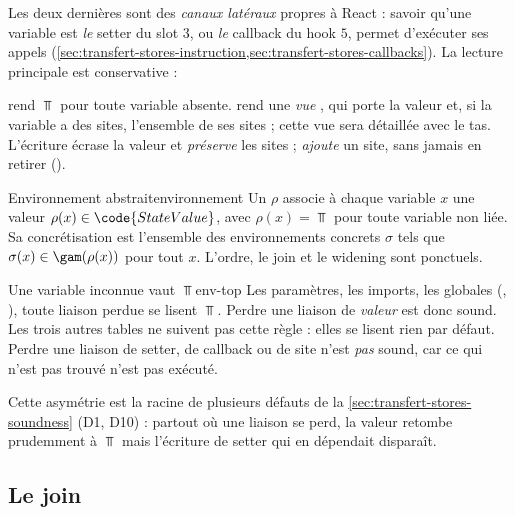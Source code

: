 Les deux dernières sont des \emph{canaux latéraux} propres à React : savoir
qu'une variable est \emph{le} setter du slot $3$, ou \emph{le} callback du
hook $5$, permet d'exécuter ses appels (\cref{sec:transfert-stores-instruction,sec:transfert-stores-callbacks}).
La lecture principale est conservative :


 rend $\Top$ pour toute variable absente. 
rend une \emph{vue} , qui porte la valeur et, si la variable a
des sites, l'ensemble de ses sites ; cette vue sera détaillée avec le tas.
L'écriture  écrase la valeur et \emph{préserve} les sites ;
 \emph{ajoute} un site, sans jamais en retirer
().

\begin{definition}{Environnement abstrait}{environnement}
  Un  $\rho$ associe à chaque variable $x$ une
  valeur $\rho(x) \in \code{StateValue}$, avec $\rho(x) = \Top$ pour toute
  variable non liée. Sa concrétisation est l'ensemble des environnements
  concrets $\sigma$ tels que $\sigma(x) \in \gam(\rho(x))$ pour tout $x$.
  L'ordre, le join et le widening sont ponctuels.
\end{definition}

\begin{invariant}{Une variable inconnue vaut $\Top$}{env-top}
  Les paramètres, les imports, les globales (, ),
  toute liaison perdue se lisent $\Top$. Perdre une liaison de \emph{valeur}
  est donc sound. Les trois autres tables ne suivent pas cette règle : elles
  se lisent \og rien par défaut\fg{}. Perdre une liaison de setter, de
  callback ou de site n'est \emph{pas} sound, car ce qui n'est pas trouvé
  n'est pas exécuté.
\end{invariant}

Cette asymétrie est la racine de plusieurs défauts de la
\cref{sec:transfert-stores-soundness} (D1, D10) : partout où une liaison se
perd, la valeur retombe prudemment à $\Top$ mais l'écriture de setter qui en
dépendait disparaît.

\subsection{Le join}

